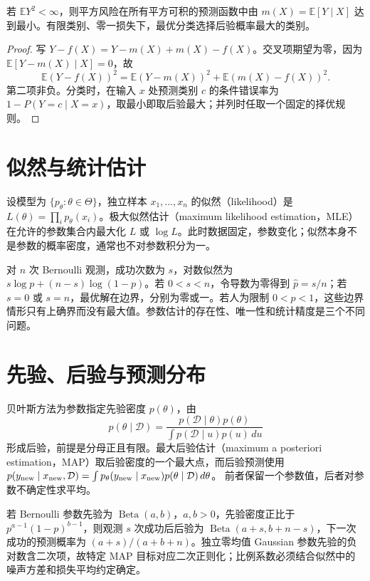\documentclass[UTF8,12pt,a4paper,fontset=fandol]{ctexbook}
\begin{document}
\begin{proposition}[平方损失与零一损失的最优预测]
若 $\mathbb EY^2<\infty$，则平方风险在所有平方可积的预测函数中由 $m(X)=\mathbb E[Y\mid X]$ 达到最小。有限类别、零一损失下，最优分类选择后验概率最大的类别。
\end{proposition}
\begin{proof}
写 $Y-f(X)=Y-m(X)+m(X)-f(X)$。交叉项期望为零，因为 $\mathbb E[Y-m(X)\mid X]=0$，故
\[
 \mathbb E(Y-f(X))^2=\mathbb E(Y-m(X))^2+\mathbb E(m(X)-f(X))^2.
\]
第二项非负。分类时，在输入 $x$ 处预测类别 $c$ 的条件错误率为 $1-P(Y=c\mid X=x)$，取最小即取后验最大；并列时任取一个固定的择优规则。
\end{proof}

\section{似然与统计估计}

设模型为 $\{p_\theta:\theta\in\Theta\}$，独立样本 $x_1,\ldots,x_n$ 的似然（likelihood）是 $L(\theta)=\prod_i p_\theta(x_i)$。极大似然估计（maximum likelihood estimation，MLE）在允许的参数集合内最大化 $L$ 或 $\log L$。此时数据固定，参数变化；似然本身不是参数的概率密度，通常也不对参数积分为一。

对 $n$ 次 Bernoulli 观测，成功次数为 $s$，对数似然为 $s\log p+(n-s)\log(1-p)$。若 $0<s<n$，令导数为零得到 $\widehat p=s/n$；若 $s=0$ 或 $s=n$，最优解在边界，分别为零或一。若人为限制 $0<p<1$，这些边界情形只有上确界而没有最大值。参数估计的存在性、唯一性和统计精度是三个不同问题。

\section{先验、后验与预测分布}

贝叶斯方法为参数指定先验密度 $p(\theta)$，由
\[
 p(\theta\mid\mathcal D)=\frac{p(\mathcal D\mid\theta)p(\theta)}
 {\int p(\mathcal D\mid u)p(u)\,du}
\]
形成后验，前提是分母正且有限。最大后验估计（maximum a posteriori estimation，MAP）取后验密度的一个最大点，而后验预测使用
$p(y_{\rm new}\mid x_{\rm new},\mathcal D)=\int p_\theta(y_{\rm new}\mid x_{\rm new})p(\theta\mid\mathcal D)\,d\theta$。
前者保留一个参数值，后者对参数不确定性求平均。

若 Bernoulli 参数先验为 $\operatorname{Beta}(a,b)$，$a,b>0$，先验密度正比于 $p^{a-1}(1-p)^{b-1}$，则观测 $s$ 次成功后后验为 $\operatorname{Beta}(a+s,b+n-s)$，下一次成功的预测概率为 $(a+s)/(a+b+n)$。独立零均值 Gaussian 参数先验的负对数含二次项，故特定 MAP 目标对应二次正则化；比例系数必须结合似然中的噪声方差和损失平均约定确定。
\end{document}
